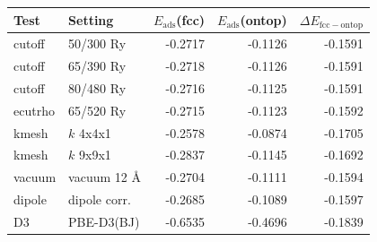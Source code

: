 \begin{tabular}{llrrr}
\toprule
Test & Setting & $E_\mathrm{ads}$(fcc) & $E_\mathrm{ads}$(ontop) & $\Delta E_\mathrm{fcc-ontop}$\\
\midrule
cutoff & 50/300 Ry & -0.2717 & -0.1126 & -0.1591\\
cutoff & 65/390 Ry & -0.2718 & -0.1126 & -0.1591\\
cutoff & 80/480 Ry & -0.2716 & -0.1125 & -0.1591\\
ecutrho & 65/520 Ry & -0.2715 & -0.1123 & -0.1592\\
kmesh & $k$ 4x4x1 & -0.2578 & -0.0874 & -0.1705\\
kmesh & $k$ 9x9x1 & -0.2837 & -0.1145 & -0.1692\\
vacuum & vacuum 12 \AA & -0.2704 & -0.1111 & -0.1594\\
dipole & dipole corr. & -0.2685 & -0.1089 & -0.1597\\
D3 & PBE-D3(BJ) & -0.6535 & -0.4696 & -0.1839\\
\bottomrule
\end{tabular}
